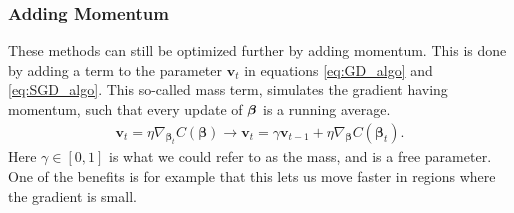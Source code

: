 \documentclass[12pt]{extarticle}
\begin{document}
\subsubsection{Adding Momentum}
These methods can still be optimized further by adding momentum. This is done by adding a term to the parameter $\mathbf{v}_t$ in equations \eqref{eq:GD_algo} and \eqref{eq:SGD_algo}. This so-called mass term, simulates the gradient having momentum, such that every update of $\boldsymbol{\beta}$ is a running average.
\begin{align} \label{eq:vt_mom}
	\mathbf{v}_t = \eta \nabla_{\boldsymbol{\beta}_t} C(\boldsymbol{\beta}) \rightarrow \mathbf{v}_t = \gamma \mathbf{v}_{t-1} + \eta \nabla_{\boldsymbol{\beta}} C(\boldsymbol{\beta}_t).
\end{align}
Here $\gamma \in [0, 1]$ is what we could refer to as the mass, and is a free parameter. One of the benefits is for example that this lets us move faster in regions where the gradient is small.
\end{document}
